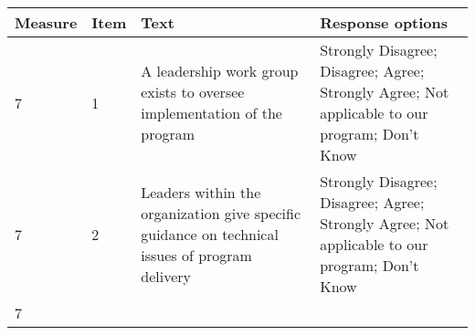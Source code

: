 \documentclass[]{article}
\begin{document}
\begin{longtable}[]{@{}llll@{}}
\toprule
\begin{minipage}[b]{0.05\columnwidth}\raggedright\strut
Measure\strut
\end{minipage} & \begin{minipage}[b]{0.04\columnwidth}\raggedright\strut
Item\strut
\end{minipage} & \begin{minipage}[b]{0.41\columnwidth}\raggedright\strut
Text\strut
\end{minipage} & \begin{minipage}[b]{0.39\columnwidth}\raggedright\strut
Response options\strut
\end{minipage}\tabularnewline
\midrule
\endhead
\begin{minipage}[t]{0.05\columnwidth}\raggedright\strut
7\strut
\end{minipage} & \begin{minipage}[t]{0.04\columnwidth}\raggedright\strut
1\strut
\end{minipage} & \begin{minipage}[t]{0.41\columnwidth}\raggedright\strut
A leadership work group exists to oversee implementation of the
program\strut
\end{minipage} & \begin{minipage}[t]{0.39\columnwidth}\raggedright\strut
Strongly Disagree; Disagree; Agree; Strongly Agree; Not applicable to
our program; Don't Know\strut
\end{minipage}\tabularnewline
\begin{minipage}[t]{0.05\columnwidth}\raggedright\strut
7\strut
\end{minipage} & \begin{minipage}[t]{0.04\columnwidth}\raggedright\strut
2\strut
\end{minipage} & \begin{minipage}[t]{0.41\columnwidth}\raggedright\strut
Leaders within the organization give specific guidance on technical
issues of program delivery\strut
\end{minipage} & \begin{minipage}[t]{0.39\columnwidth}\raggedright\strut
Strongly Disagree; Disagree; Agree; Strongly Agree; Not applicable to
our program; Don't Know\strut
\end{minipage}\tabularnewline
\begin{minipage}[t]{0.05\columnwidth}\raggedright\strut
7\strut
\end{minipage} & \begin{minipage}[t]{0.04\columnwidth}\raggedright\strut

\end{minipage}
\end{longtable}
\end{document}
